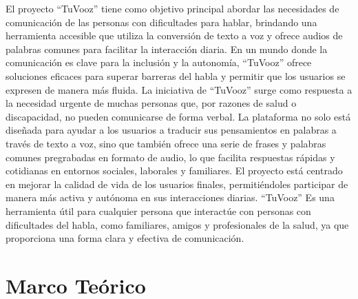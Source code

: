\documentclass[12pt, a4paper, twocolumn]{article}
\begin{document}
El proyecto “TuVooz”  tiene como objetivo principal abordar las necesidades de comunicación de las personas con dificultades para hablar, brindando una herramienta accesible que utiliza la conversión de texto a voz y ofrece audios de palabras comunes para facilitar la interacción diaria. En un mundo donde la comunicación es clave para la inclusión y la autonomía, “TuVooz” ofrece soluciones eficaces para superar barreras del habla y permitir que los usuarios se expresen de manera más fluida.
La iniciativa de “TuVooz” surge como respuesta a la necesidad urgente de muchas personas que, por razones de salud o discapacidad, no pueden comunicarse de forma verbal. La plataforma no solo está diseñada para ayudar a los usuarios a traducir sus pensamientos en palabras a través de texto a voz, sino que también ofrece una serie de frases y palabras comunes pregrabadas en formato de audio, lo que facilita respuestas rápidas y cotidianas en entornos sociales, laborales y familiares.
El proyecto está centrado en mejorar la calidad de vida de los usuarios finales, permitiéndoles participar de manera más activa y autónoma en sus interacciones diarias. “TuVooz” Es una herramienta útil para cualquier persona que interactúe con personas con dificultades del habla, como familiares, amigos y profesionales de la salud, ya que proporciona una forma clara y efectiva de comunicación.


\section{Marco Teórico}
\end{document}
